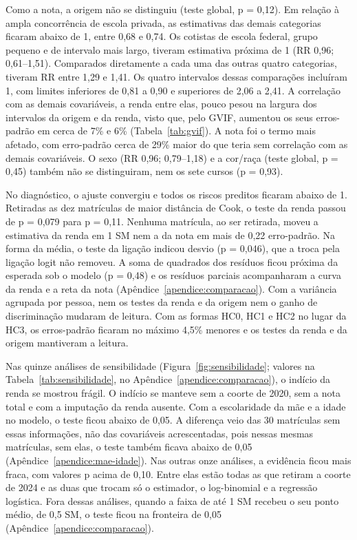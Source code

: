 \documentclass[12pt,a4paper]{article}
\begin{document}
Como a nota, a origem não se distinguiu (teste global, p = 0,12). Em relação à ampla concorrência de escola privada, as estimativas das demais categorias ficaram abaixo de 1, entre 0,68 e 0,74. Os cotistas de escola federal, grupo pequeno e de intervalo mais largo, tiveram estimativa próxima de 1 (RR 0,96; 0,61–1,51). Comparados diretamente a cada uma das outras quatro categorias, tiveram RR entre 1,29 e 1,41. Os quatro intervalos dessas comparações incluíram 1, com limites inferiores de 0,81 a 0,90 e superiores de 2,06 a 2,41. A correlação com as demais covariáveis, a renda entre elas, pouco pesou na largura dos intervalos da origem e da renda, visto que, pelo GVIF, aumentou os seus erros-padrão em cerca de 7\% e 6\% (Tabela~\ref{tab:gvif}). A nota foi o termo mais afetado, com erro-padrão cerca de 29\% maior do que teria sem correlação com as demais covariáveis. O sexo (RR 0,96; 0,79–1,18) e a cor/raça (teste global, p = 0,45) também não se distinguiram, nem os sete cursos (p = 0,93).

No diagnóstico, o ajuste convergiu e todos os riscos preditos ficaram abaixo de 1. Retiradas as dez matrículas de maior distância de Cook, o teste da renda passou de p = 0,079 para p = 0,11. Nenhuma matrícula, ao ser retirada, moveu a estimativa da renda em 1 SM nem a da nota em mais de 0,22 erro-padrão. Na forma da média, o teste da ligação indicou desvio (p = 0,046), que a troca pela ligação logit não removeu. A soma de quadrados dos resíduos ficou próxima da esperada sob o modelo (p = 0,48) e os resíduos parciais acompanharam a curva da renda e a reta da nota (Apêndice~\ref{apendice:comparacao}). Com a variância agrupada por pessoa, nem os testes da renda e da origem nem o ganho de discriminação mudaram de leitura. Com as formas HC0, HC1 e HC2 no lugar da HC3, os erros-padrão ficaram no máximo 4,5\% menores e os testes da renda e da origem mantiveram a leitura.

Nas quinze análises de sensibilidade (Figura~\ref{fig:sensibilidade}; valores na Tabela~\ref{tab:sensibilidade}, no Apêndice~\ref{apendice:comparacao}), o indício da renda se mostrou frágil. O indício se manteve sem a coorte de 2020, sem a nota total e com a imputação da renda ausente. Com a escolaridade da mãe e a idade no modelo, o teste ficou abaixo de 0,05. A diferença veio das 30 matrículas sem essas informações, não das covariáveis acrescentadas, pois nessas mesmas matrículas, sem elas, o teste também ficava abaixo de 0,05 (Apêndice~\ref{apendice:mae-idade}). Nas outras onze análises, a evidência ficou mais fraca, com valores p acima de 0,10. Entre elas estão todas as que retiram a coorte de 2024 e as duas que trocam só o estimador, o log-binomial e a regressão logística. Fora dessas análises, quando a faixa de até 1 SM recebeu o seu ponto médio, de 0,5 SM, o teste ficou na fronteira de 0,05 (Apêndice~\ref{apendice:comparacao}).
\end{document}
